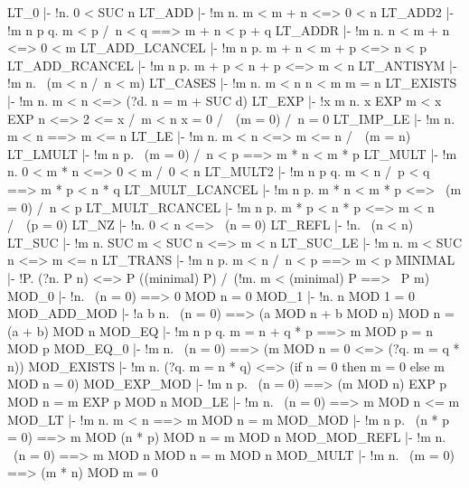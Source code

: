 \ENDTHEOREM
\THEOREM LT\_0
  |- !n. 0 < SUC n
\ENDTHEOREM
\THEOREM LT\_ADD
  |- !m n. m < m + n <=> 0 < n
\ENDTHEOREM
\THEOREM LT\_ADD2
  |- !m n p q. m < p /\ n < q ==> m + n < p + q
\ENDTHEOREM
\THEOREM LT\_ADDR
  |- !m n. n < m + n <=> 0 < m
\ENDTHEOREM
\THEOREM LT\_ADD\_LCANCEL
  |- !m n p. m + n < m + p <=> n < p
\ENDTHEOREM
\THEOREM LT\_ADD\_RCANCEL
  |- !m n p. m + p < n + p <=> m < n
\ENDTHEOREM
\THEOREM LT\_ANTISYM
  |- !m n. ~(m < n /\ n < m)
\ENDTHEOREM
\THEOREM LT\_CASES
  |- !m n. m < n \/ n < m \/ m = n
\ENDTHEOREM
\THEOREM LT\_EXISTS
  |- !m n. m < n <=> (?d. n = m + SUC d)
\ENDTHEOREM
\THEOREM LT\_EXP
  |- !x m n.
         x EXP m < x EXP n <=> 2 <= x /\ m < n \/ x = 0 /\ ~(m = 0) /\ n = 0
\ENDTHEOREM
\THEOREM LT\_IMP\_LE
  |- !m n. m < n ==> m <= n
\ENDTHEOREM
\THEOREM LT\_LE
  |- !m n. m < n <=> m <= n /\ ~(m = n)
\ENDTHEOREM
\THEOREM LT\_LMULT
  |- !m n p. ~(m = 0) /\ n < p ==> m * n < m * p
\ENDTHEOREM
\THEOREM LT\_MULT
  |- !m n. 0 < m * n <=> 0 < m /\ 0 < n
\ENDTHEOREM
\THEOREM LT\_MULT2
  |- !m n p q. m < n /\ p < q ==> m * p < n * q
\ENDTHEOREM
\THEOREM LT\_MULT\_LCANCEL
  |- !m n p. m * n < m * p <=> ~(m = 0) /\ n < p
\ENDTHEOREM
\THEOREM LT\_MULT\_RCANCEL
  |- !m n p. m * p < n * p <=> m < n /\ ~(p = 0)
\ENDTHEOREM
\THEOREM LT\_NZ
  |- !n. 0 < n <=> ~(n = 0)
\ENDTHEOREM
\THEOREM LT\_REFL
  |- !n. ~(n < n)
\ENDTHEOREM
\THEOREM LT\_SUC
  |- !m n. SUC m < SUC n <=> m < n
\ENDTHEOREM
\THEOREM LT\_SUC\_LE
  |- !m n. m < SUC n <=> m <= n
\ENDTHEOREM
\THEOREM LT\_TRANS
  |- !m n p. m < n /\ n < p ==> m < p
\ENDTHEOREM
\THEOREM MINIMAL
  |- !P. (?n. P n) <=> P ((minimal) P) /\ (!m. m < (minimal) P ==> ~P m)
\ENDTHEOREM
\THEOREM MOD\_0
  |- !n. ~(n = 0) ==> 0 MOD n = 0
\ENDTHEOREM
\THEOREM MOD\_1
  |- !n. n MOD 1 = 0
\ENDTHEOREM
\THEOREM MOD\_ADD\_MOD
  |- !a b n. ~(n = 0) ==> (a MOD n + b MOD n) MOD n = (a + b) MOD n
\ENDTHEOREM
\THEOREM MOD\_EQ
  |- !m n p q. m = n + q * p ==> m MOD p = n MOD p
\ENDTHEOREM
\THEOREM MOD\_EQ\_0
  |- !m n. ~(n = 0) ==> (m MOD n = 0 <=> (?q. m = q * n))
\ENDTHEOREM
\THEOREM MOD\_EXISTS
  |- !m n. (?q. m = n * q) <=> (if n = 0 then m = 0 else m MOD n = 0)
\ENDTHEOREM
\THEOREM MOD\_EXP\_MOD
  |- !m n p. ~(n = 0) ==> (m MOD n) EXP p MOD n = m EXP p MOD n
\ENDTHEOREM
\THEOREM MOD\_LE
  |- !m n. ~(n = 0) ==> m MOD n <= m
\ENDTHEOREM
\THEOREM MOD\_LT
  |- !m n. m < n ==> m MOD n = m
\ENDTHEOREM
\THEOREM MOD\_MOD
  |- !m n p. ~(n * p = 0) ==> m MOD (n * p) MOD n = m MOD n
\ENDTHEOREM
\THEOREM MOD\_MOD\_REFL
  |- !m n. ~(n = 0) ==> m MOD n MOD n = m MOD n
\ENDTHEOREM
\THEOREM MOD\_MULT
  |- !m n. ~(m = 0) ==> (m * n) MOD m = 0
